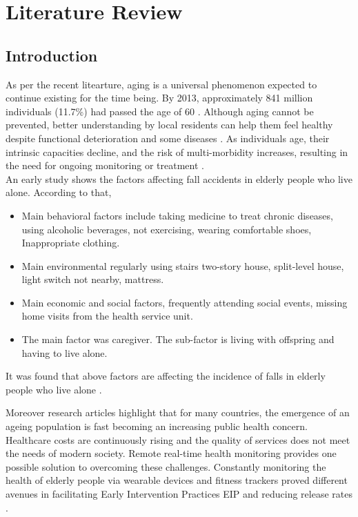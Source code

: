 \newpage

\chapter{Literature Review}

\section{Introduction}
As per the recent litearture, aging is a universal phenomenon expected to continue 
existing for the time being. By 2013, approximately 
841 million individuals (11.7\%) had passed the age of 
60 \cite{MH17464}. Although aging cannot be prevented, better understanding by local residents can 
help them feel healthy despite functional deterioration 
and some diseases \cite{eldersHealthFactors}. As individuals age, their intrinsic capacities decline, and the risk of multi-morbidity increases, resulting in the need for ongoing monitoring or treatment \cite{xue2021intrinsic}. \\

An early study shows the factors affecting fall accidents in elderly people who live alone. According to that,\\ 
\begin{itemize}
    \item Main behavioral factors include taking medicine to treat chronic diseases, using alcoholic beverages, not exercising, wearing comfortable shoes, Inappropriate clothing. 
    \item Main environmental regularly using stairs two-story house, split-level house, light switch not nearby, mattress. 
    \item Main economic and social factors, frequently attending social events, missing home visits from the health service unit. 
    \item The main factor was caregiver. The sub-factor is living with offspring and having to live alone.
\end{itemize}
It was found that above factors are affecting the incidence of falls in elderly people who live alone
 \cite{Srenual_Kanokthet_2024}.

Moreover research articles highlight that for many countries, the emergence of an ageing population is fast becoming an increasing public health concern. Healthcare costs are continuously rising and the quality of services does not meet the needs of modern society. Remote real-time health monitoring provides one possible solution to overcoming these challenges. Constantly monitoring the
 health of elderly people via wearable devices and fitness trackers proved different avenues in facilitating Early Intervention Practices EIP and reducing release rates \cite{RemoteHealth}.\\
 
